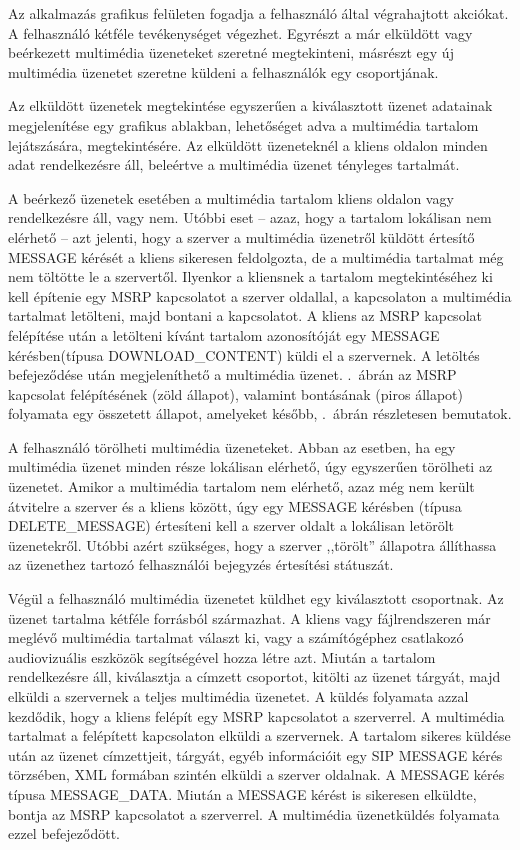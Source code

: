 Az alkalmazás grafikus felületen fogadja a felhasználó által végrahajtott akciókat. A felhasználó kétféle tevékenységet végezhet. Egyrészt a már elküldött vagy beérkezett multimédia üzeneteket szeretné megtekinteni, másrészt egy új multimédia üzenetet szeretne küldeni a felhasználók egy csoportjának. 

Az elküldött üzenetek megtekintése egyszerűen a kiválasztott üzenet adatainak megjelenítése egy grafikus ablakban, lehetőséget adva a multimédia tartalom lejátszására, megtekintésére. Az elküldött üzeneteknél a kliens oldalon minden adat rendelkezésre áll, beleértve a multimédia üzenet tényleges tartalmát.

A beérkező üzenetek esetében a multimédia tartalom kliens oldalon vagy rendelkezésre áll, vagy nem. Utóbbi eset -- azaz, hogy a tartalom lokálisan nem elérhető -- azt jelenti, hogy a szerver a multimédia üzenetről küldött értesítő MESSAGE kérését a kliens sikeresen feldolgozta, de a multimédia tartalmat még nem töltötte le a szervertől. Ilyenkor a kliensnek a tartalom megtekintéséhez ki kell építenie egy MSRP kapcsolatot a szerver oldallal, a kapcsolaton a multimédia tartalmat letölteni, majd bontani a kapcsolatot. A kliens az MSRP kapcsolat felépítése után a letölteni kívánt tartalom azonosítóját egy MESSAGE kérésben\footnotemark[2] (típusa DOWNLOAD\_CONTENT) küldi el a szervernek. A letöltés befejeződése után megjeleníthető a multimédia üzenet. .~ábrán az MSRP kapcsolat felépítésének (zöld állapot), valamint bontásának (piros állapot) folyamata egy összetett állapot, amelyeket később, .~ábrán részletesen bemutatok.

A felhasználó törölheti multimédia üzeneteket. Abban az esetben, ha egy multimédia üzenet minden része lokálisan elérhető, úgy egyszerűen törölheti az üzenetet. Amikor a multimédia tartalom nem elérhető, azaz még nem került átvitelre a szerver és a kliens között, úgy egy MESSAGE kérésben (típusa DELETE\_MESSAGE) értesíteni kell a szerver oldalt a lokálisan letörölt üzenetekről. Utóbbi azért szükséges, hogy a szerver ,,törölt'' állapotra állíthassa az üzenethez tartozó felhasználói bejegyzés értesítési státuszát. 
 
Végül a felhasználó multimédia üzenetet küldhet egy kiválasztott csoportnak. Az üzenet tartalma kétféle forrásból származhat. A kliens vagy fájlrendszeren már meglévő multimédia tartalmat választ ki, vagy a számítógéphez csatlakozó audiovizuális eszközök segítségével hozza létre azt. Miután a tartalom rendelkezésre áll, kiválasztja a címzett csoportot, kitölti az üzenet tárgyát, majd elküldi a szervernek a teljes multimédia üzenetet. A küldés folyamata azzal kezdődik, hogy a kliens felépít egy MSRP kapcsolatot a szerverrel. A multimédia tartalmat a felépített kapcsolaton elküldi a szervernek. A tartalom sikeres küldése után az üzenet címzettjeit, tárgyát, egyéb információit egy SIP MESSAGE kérés törzsében, XML formában szintén elküldi a szerver oldalnak. A MESSAGE kérés típusa MESSAGE\_DATA. Miután a MESSAGE kérést is sikeresen elküldte, bontja az MSRP kapcsolatot a szerverrel. A multimédia üzenetküldés folyamata ezzel befejeződött.

